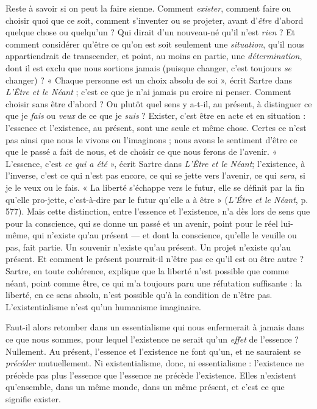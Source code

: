 Reste à savoir si on peut la faire sienne. Comment {\it exister}, comment faire ou
choisir quoi que ce soit, comment s’inventer ou se projeter, avant d’{\it être} d’abord
quelque chose ou quelqu'un ? Qui dirait d’un nouveau-né qu’il n’est {\it rien} ? Et
comment considérer qu'être ce qu’on est soit seulement une {\it situation}, qu’il
nous appartiendrait de transcender, et point, au moins en partie, une {\it détermination},
dont il est exclu que nous sortions jamais (puisque changer, c’est toujours
{\it se} changer) ? « Chaque personne est un choix absolu de soi », écrit Sartre
dans {\it L'Être et le Néant} ; c'est ce que je n’ai jamais pu croire ni penser. Comment
choisir sans être d’abord ? Ou plutôt quel sens y a-t-il, au présent, à distinguer
ce que je {\it fais} ou {\it veux} de ce que je {\it suis} ? Exister, c’est être en acte et en
situation : l'essence et l’existence, au présent, sont une seule et même chose.
Certes ce n’est pas ainsi que nous le vivons ou l’imaginons ; nous avons le sentiment
d’être ce que le passé a fait de nous, et de choisir ce que nous ferons de
l'avenir. « L’essence, c’est {\it ce qui a été} », écrit Sartre dans {\it L'Être et le Néant};
l'existence, à l’inverse, c’est ce qui n’est pas encore, ce qui se jette vers l’avenir,
ce qui {\it sera}, si je le veux ou le fais. « La liberté s'échappe vers le futur, elle se
définit par la fin qu’elle pro-jette, c’est-à-dire par le futur qu’elle a à être »
({\it L'Étre et le Néant}, p. 577). Mais cette distinction, entre l’essence et l’existence,
n’a dès lors de sens que pour la conscience, qui se donne un passé et un avenir,
point pour le réel lui-même, qui n’existe qu’au présent — et dont la conscience,
qu’elle le veuille ou pas, fait partie. Un souvenir n’existe qu’au présent. Un
projet n'existe qu’au présent. Et comment le présent pourrait-il n’être pas ce
qu’il est ou être autre ? Sartre, en toute cohérence, explique que la liberté n’est
possible que comme néant, point comme être, ce qui m’a toujours paru une
réfutation suffisante : la liberté, en ce sens absolu, n’est possible qu’à la condition
de n’être pas. L’existentialisme n’est qu’un humanisme imaginaire.

Faut-il alors retomber dans un essentialisme qui nous enfermerait à jamais
dans ce que nous sommes, pour lequel l’existence ne serait qu’un {\it effet} de
l'essence ? Nullement. Au présent, l’essence et l'existence ne font qu’un, et ne
sauraient se {\it précéder} mutuellement. Ni existentialisme, donc, ni essentialisme :
l'existence ne précède pas plus l’essence que l’essence ne précède l’existence.
Elles n'existent qu’ensemble, dans un même monde, dans un même présent, et
c’est ce que signifie exister.

